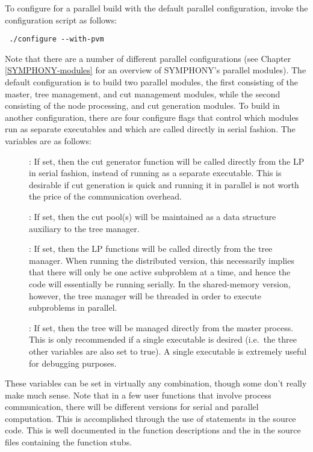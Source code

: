 To configure for a parallel build with the default parallel configuration,
invoke the configuration script as follows: {\color{Brown}
\begin{verbatim}
 ./configure --with-pvm
\end{verbatim}
} 
Note that there are a number of different parallel configurations (see
Chapter \ref{SYMPHONY-modules} for an overview of SYMPHONY's parallel
modules). The default configuration is to build two parallel modules, the
first consisting of the master, tree management, and cut management modules,
while the second consisting of the node processing, and cut generation
modules. To build in another configuration, there are four configure flags
that control which modules run as separate executables and which are called
directly in serial fashion. The variables are as follows:
\begin{description}
        \item[] : If set, then the cut generator function will
        be called directly from the LP in serial fashion, instead of running
        as a separate executable. This is desirable if cut generation is quick
        and running it in parallel is not worth the price of the communication
        overhead.
        \item[] : If set, then the cut pool(s) will be
        maintained as a data structure auxiliary to the tree manager.
        \item[] : If set, then the LP functions will be called
        directly from the tree manager. When running the distributed version,
        this necessarily implies that there will only be one active subproblem
        at a time, and hence the code will essentially be running serially. In
        the shared-memory version, however, the tree manager will be threaded
        in order to execute subproblems in parallel.
        \item[] : If set, then the tree will be managed
        directly from the master process. This is only recommended if a single
        executable is desired (i.e.~the three other variables are also set to
        true). A single executable is extremely useful for debugging purposes.
\end{description}
These variables can be set in virtually any combination, though some
don't really make much sense. Note that in a few user functions that
involve process communication, there will be different versions for
serial and parallel computation. This is accomplished through the use
of  statements in the source code. This is well documented
in the function descriptions and the in the source files containing
the function stubs.


